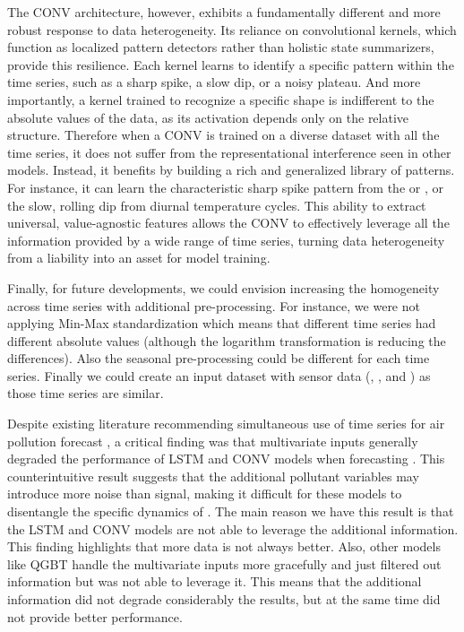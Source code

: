 \documentclass[12pt,a4paper]{book}
\begin{document}
The CONV architecture, however, exhibits a fundamentally different and more robust response to data heterogeneity. Its reliance on convolutional kernels, which function as localized pattern detectors rather than holistic state summarizers, provide this resilience. Each kernel learns to identify a specific pattern within the time series, such as a sharp spike, a slow dip, or a noisy plateau. And more importantly, a kernel trained to recognize a specific shape is indifferent to the absolute values of the data, as its activation depends only on the relative structure.  Therefore when a CONV is trained on a diverse dataset with all the time series, it does not suffer from the representational interference seen in other models. Instead, it benefits by building a rich and generalized library of patterns. For instance, it can learn the characteristic sharp spike pattern from the \no{} or \ot{}, or the slow, rolling dip from diurnal temperature cycles. This ability to extract universal, value-agnostic features allows the CONV to effectively leverage all the information provided by a wide range of time series, turning data heterogeneity from a liability into an asset for model training.

Finally, for future developments, we could envision increasing the homogeneity across time series with additional pre-processing. For instance, we were not applying Min-Max standardization which means that different time series had different absolute values (although the logarithm transformation is reducing the differences). Also the seasonal pre-processing could be different for each time series. Finally we could create an input dataset with sensor data (\no{}, \ot{}, \pmtwo{} and \pmten{}) as those time series are similar.

Despite existing literature recommending simultaneous use of time series for air pollution forecast \citep{rakholia_multi-output_2023}, a critical finding was that multivariate inputs generally degraded the performance of LSTM and CONV models when forecasting \no{}. This counterintuitive result suggests that the additional pollutant variables may introduce more noise than signal, making it difficult for these models to disentangle the specific dynamics of \no{}. The main reason we have this result is that the LSTM and CONV models are not able to leverage the additional information. This finding highlights that more data is not always better. Also, other models like QGBT handle the multivariate inputs more gracefully and just filtered out information but was not able to leverage it. This means that the additional information did not degrade considerably the results, but at the same time did not provide better performance.
\end{document}
